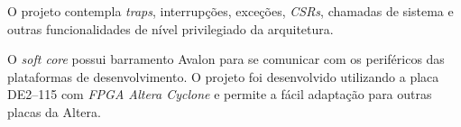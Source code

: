 {
    O projeto contempla \textit{traps}, interrupções, exceções,
    \textit{CSRs}, chamadas de sistema e outras funcionalidades de nível
    privilegiado da arquitetura.
}

{
    O \textit{soft core} possui barramento Avalon para se comunicar com os
    periféricos das plataformas de desenvolvimento. O projeto foi
    desenvolvido utilizando a placa DE2--115 com \textit{FPGA Altera
    Cyclone} e permite a fácil adaptação para outras placas da Altera.
}

